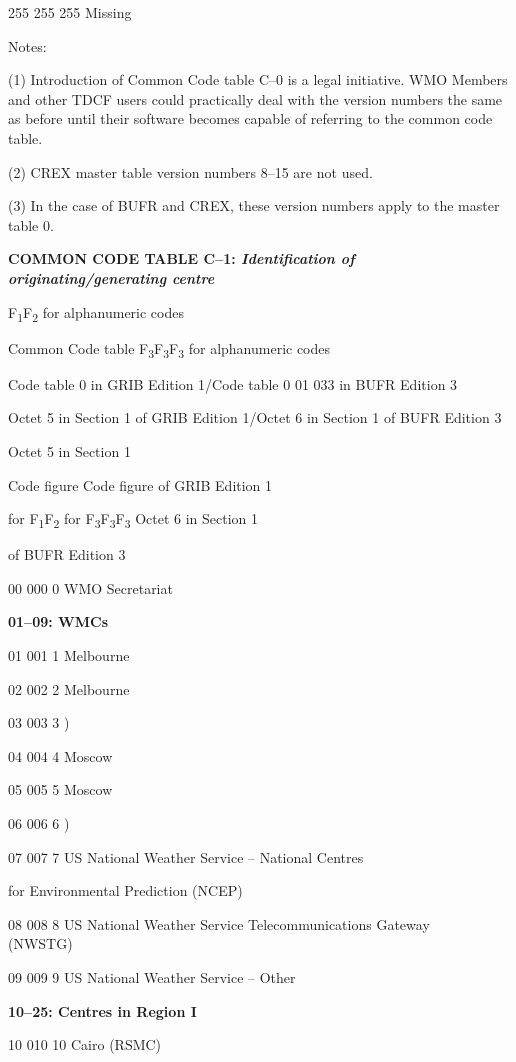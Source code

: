 255 255 255 Missing

Notes:

(1) Introduction of Common Code table C--0 is a legal initiative. WMO Members and other TDCF users could practically deal with the version numbers the same as before until their software becomes capable of referring to the common code table.

(2) CREX master table version numbers 8--15 are not used.

(3) In the case of BUFR and CREX, these version numbers apply to the master table 0.

\textbf{COMMON CODE TABLE C--1: \emph{Identification of originating/generating centre}}

F\textsubscript{1}F\textsubscript{2} for alphanumeric codes

Common Code table F\textsubscript{3}F\textsubscript{3}F\textsubscript{3} for alphanumeric codes

Code table 0 in GRIB Edition 1/Code table 0 01 033 in BUFR Edition 3

Octet 5 in Section 1 of GRIB Edition 1/Octet 6 in Section 1 of BUFR Edition 3

Octet 5 in Section 1

Code figure Code figure of GRIB Edition 1

for F\textsubscript{1}F\textsubscript{2} for F\textsubscript{3}F\textsubscript{3}F\textsubscript{3} Octet 6 in Section 1

of BUFR Edition 3

00 000 0 WMO Secretariat

\textbf{01--09: WMCs}

01 001 1 Melbourne

02 002 2 Melbourne

03 003 3 )

04 004 4 Moscow

05 005 5 Moscow

06 006 6 )

07 007 7 US National Weather Service -- National Centres

for Environmental Prediction (NCEP)

08 008 8 US National Weather Service Telecommunications Gateway\\
(NWSTG)

09 009 9 US National Weather Service -- Other

\textbf{10--25: Centres in Region I}

10 010 10 Cairo (RSMC)

